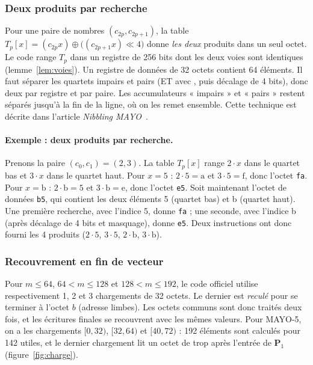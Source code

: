 \subsubsection{Deux produits par recherche}
Pour une paire de nombres $(c_{2p},c_{2p+1})$, la table $T_p[x]=(c_{2p}x)\oplus\big((c_{2p+1}x)\ll4\big)$ donne \emph{les deux} produits dans un seul octet. Le code range $T_p$ dans un registre de 256 bits dont les deux voies sont identiques (lemme~\ref{lem:voies}). Un registre de données de 32 octets contient 64 éléments. Il faut séparer les quartets impairs et pairs (ET avec , puis décalage de 4 bits), donc deux \vpshufb{} par registre et par paire. Les accumulateurs « impairs » et « pairs » restent séparés jusqu'à la fin de la ligne, où on les remet ensemble. Cette technique est décrite dans l'article \emph{Nibbling MAYO}~\cite{nibbling}.

\paragraph{Exemple : deux produits par recherche.} Prenons la paire $(c_0,c_1)=(2,3)$. La table $T_p[x]$ range $2\cdot x$ dans le quartet bas et $3\cdot x$ dans le quartet haut. Pour $x=5$ : $2\cdot5=\mathrm{a}$ et $3\cdot5=\mathrm{f}$, donc l'octet \texttt{fa}. Pour $x=\mathrm{b}$ : $2\cdot\mathrm{b}=5$ et $3\cdot\mathrm{b}=\mathrm{e}$, donc l'octet \texttt{e5}. Soit maintenant l'octet de données \texttt{b5}, qui contient les deux éléments 5 (quartet bas) et b (quartet haut). Une première recherche, avec l'indice 5, donne \texttt{fa} ; une seconde, avec l'indice b (après décalage de 4 bits et masquage), donne \texttt{e5}. Deux instructions \vpshufb{} ont donc fourni les 4 produits ($2\cdot5$, $3\cdot5$, $2\cdot\mathrm{b}$, $3\cdot\mathrm{b}$).

\subsubsection{Recouvrement en fin de vecteur}
Pour $m\le64$, $64<m\le128$ et $128<m\le192$, le code officiel utilise respectivement 1, 2 et 3 chargements de 32 octets. Le dernier est \emph{reculé} pour se terminer à l'octet $b$ (adresse  limbes). Les octets communs sont donc traités deux fois, et les écritures finales se recouvrent avec les mêmes valeurs. Pour MAYO-5, on a les chargements $[0,32)$, $[32,64)$ et $[40,72)$ : 192 éléments sont calculés pour 142 utiles, et le dernier chargement lit un octet de trop après l'entrée de $\mathbf{P}_1$ (figure~\ref{fig:charge}).

